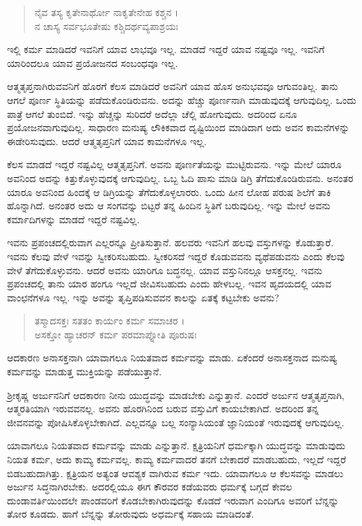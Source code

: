 \begin{verse}
ನೈವ ತಸ್ಯ ಕೃತೇನಾರ್ಥೋ ನಾಕೃತೇನೇಹ ಕಶ್ಚನ ।\\ನ ಚಾಸ್ಯ ಸರ್ವಭೂತೇಷು ಕಶ್ಚಿದರ್ಥವ್ಯಪಾಶ್ರಯಃ 
\end{verse}

{\small ಇಲ್ಲಿ ಕರ್ಮ ಮಾಡಿದರೆ ಇವನಿಗೆ ಯಾವ ಲಾಭವೂ ಇಲ್ಲ. ಮಾಡದೆ ಇದ್ದರೆ ಯಾವ ನಷ್ಟವೂ ಇಲ್ಲ. ಇವನಿಗೆ ಯಾರಿಂದಲೂ ಯಾವ ಪ್ರಯೋಜನದ ಸಂಬಂಧವೂ ಇಲ್ಲ.}

ಆತ್ಮತೃಪ್ತನಾಗಿರುವವನಿಗೆ ಹೊರಗೆ ಕೆಲಸ ಮಾಡಿದರೆ ಅವನಿಗೆ ಯಾವ ಹೊಸ ಅನುಭವವೂ ಆಗುವಂತಿಲ್ಲ. ತಾನು ಆಗಲೆ ಪೂರ್ಣ ಸ್ಥಿತಿಯನ್ನು ಪಡೆದುಕೊಂಡಿರುವನು. ಅದನ್ನು ಹೆಚ್ಚು ಪೂರ್ಣನಾಗಿ ಮಾಡುವುದಕ್ಕೆ ಆಗುವುದಿಲ್ಲ. ಒಂದು ಪಾತ್ರೆ ಆಗಲೆ ತುಂಬಿದೆ. ಇನ್ನು ಹೆಚ್ಚನ್ನು ಸುರಿದರೆ ಅದೆಲ್ಲಾ ಚೆಲ್ಲಿ ಹೋಗುವುದು. ಅದರಿಂದ ಏನೂ ಪ್ರಯೋಜನವಾಗುವುದಿಲ್ಲ. ಸಾಧಾರಣ ಮನುಷ್ಯ ಲೌಕಿಕವಾದ ದೃಷ್ಟಿಯಿಂದ ಮಾಡಿದಾಗ ಅದು ಅವನ ಕಾಮನೆಗಳನ್ನು ಈಡೇರಿಸುವುದು. ಆದರೆ ಆತ್ಮತೃಪ್ತನಿಗೆ ಯಾವ ಕಾಮನೆಗಳೂ ಇಲ್ಲ.

ಕೆಲಸ ಮಾಡದೆ ಇದ್ದರೆ ನಷ್ಟವಿಲ್ಲ ಆತ್ಮತೃಪ್ತನಿಗೆ. ಅವನು ಪೂರ್ಣತೆಯನ್ನು ಮುಟ್ಟಿರುವನು. ಇನ್ನು ಮೇಲೆ ಯಾರೂ ಅವನಿಂದ ಅದನ್ನು ಕಿತ್ತುಕೊಳ್ಳುವುದಕ್ಕೆ ಆಗುವುದಿಲ್ಲ. ಒಬ್ಬ ಓದಿ ಪಾಸು ಮಾಡಿ ಡಿಗ್ರಿ ತೆಗೆದುಕೊಂಡಿರುವನು. ಅನಂತರ ಯಾರೂ ಅವನಿಂದ ಹಿಂದಕ್ಕೆ ಆ ಡಿಗ್ರಿಯನ್ನು ತೆಗೆದುಕೊಳ್ಳಲಾರರು. ಒಂದು ಹೀನ ಲೋಹ ಪರುಷ ಶಿಲೆಗೆ ತಾಕಿ ಹೊನ್ನಾಗಿದೆ. ಅನಂತರ ಅದು ಆ ಸಂಗವನ್ನು ಬಿಟ್ಟರೆ ತನ್ನ ಹಿಂದಿನ ಸ್ಥಿತಿಗೆ ಬರುವುದಿಲ್ಲ. ಇನ್ನು ಮೇಲೆ ಅವನು ಕರ್ಮಾದಿಗಳನ್ನು ಮಾಡದೆ ಇದ್ದರೆ ನಷ್ಟವಿಲ್ಲ.

ಇವನು ಪ್ರಪಂಚದಲ್ಲಿರುವಾಗ ಎಲ್ಲರನ್ನೂ ಪ್ರೀತಿಸುತ್ತಾನೆ. ಹಲವರು ಇವನಿಗೆ ಹಲವು ವಸ್ತುಗಳನ್ನು ಕೊಡುತ್ತಾರೆ. ಇವನು ಕೆಲವು ವೇಳೆ ಇವನ್ನು ಸ್ವೀಕರಿಸಬಹುದು. ಸ್ವೀಕರಿಸದೆ ಇದ್ದರೆ ಕೊಡುವವನು ವ್ಯಥೆಪಡುವನು ಎಂದು ಕೆಲವು ವೇಳೆ ತೆಗೆದುಕೊಳ್ಳುವನು. ಆದರೆ ಅವನು ಯಾರಿಗೂ ಬದ್ಧನಲ್ಲ. ಯಾವ ವಸ್ತುನಿನಲ್ಲೂ ಆಸಕ್ತನಲ್ಲ. ಇವನು ಪ್ರಪಂಚದಲ್ಲಿ ತಾನು ಯಾರ ಹಂಗೂ ಇಲ್ಲದೆ ಜೀವಿಸಬಹುದು ಎಂದು ಹೇಳಬಲ್ಲ. ಇವನ ಹೃದಯದಲ್ಲಿ ಯಾವ ವಾಂಛನೆಗಳೂ ಇಲ್ಲ. ಇನ್ನು ಅವನ್ನು ತೃಪ್ತಿಪಡಿಸುವವನ ಕಾಲನ್ನು ಏತಕ್ಕೆ ಕಟ್ಟಬೇಕು ಅವನು?

\begin{verse}
ತಸ್ಮಾದಸಕ್ತಃ ಸತತಂ ಕಾರ್ಯಂ ಕರ್ಮ ಸಮಾಚರ ।\\ಅಸಕ್ತೋ ಹ್ಯಾಚರನ್ ಕರ್ಮ ಪರಮಾಪ್ನೋತಿ ಪೂರುಷಃ 
\end{verse}

{\small ಆದಕಾರಣ ಅನಾಸಕ್ತನಾಗಿ ಯಾವಾಗಲೂ ನಿಯತವಾದ ಕರ್ಮವನ್ನು ಮಾಡು. ಏಕೆಂದರೆ ಅನಾಸಕ್ತನಾದ ಮನುಷ್ಯ ಕರ್ಮವನ್ನು ಮಾಡುತ್ತ ಮುಕ್ತಿಯನ್ನು ಪಡೆಯುತ್ತಾನೆ.}

ಶ್ರೀಕೃಷ್ಣ ಅರ್ಜುನನಿಗೆ ಆದಕಾರಣ ನೀನು ಯುದ್ಧವನ್ನು ಮಾಡಬೇಕು ಎನ್ನುತ್ತಾನೆ. ಎಂದರೆ ಅರ್ಜುನ ಆತ್ಮತೃಪ್ತನಾಗಿ, ಆತ್ಮರತಿಯಾಗಿ ಇರುವವನಲ್ಲ. ಅವನು ಹೊರಗಿನಿಂದ ಬರುವ ವಸ್ತುವಿಗೆ ಕಾಯಬೇಕಾಗಿದೆ. ಅದರಿಂದ ತನ್ನ ಜೀವನವನ್ನು ಪೋಷಿಸಿಕೊಳ್ಳಬೇಕಾಗಿದೆ. ಎಲ್ಲವನ್ನೂ ಬಲ್ಲ ಸಂನ್ಯಾಸಿಯಂತೆ ಜ್ಞಾನಿಯಂತೆ ಇರುವುದಕ್ಕೆ ಆಗುವುದಿಲ್ಲ.

ಯಾವಾಗಲೂ ನಿಯತವಾದ ಕರ್ಮವನ್ನು ಮಾಡು ಎನ್ನುತ್ತಾನೆ. ಕ್ಷತ್ರಿಯನಿಗೆ ಧರ್ಮಕ್ಕಾಗಿ ಯುದ್ಧವನ್ನು ಮಾಡುವುದು ನಿಯತ ಕರ್ಮ, ಅದು ಕಾಮ್ಯ ಕರ್ಮವಲ್ಲ. ಕಾಮ್ಯ ಕರ್ಮವಾದರೆ ತನಗೆ ಬೇಕಾದರೆ ಮಾಡಬಹುದು, ಇಲ್ಲದೆ ಇದ್ದರೆ ಬಿಡಬಹುದಾಗಿತ್ತು. ಕ್ಷತ್ರಿಯನ ಅತ್ಯಂತ ಆವಶ್ಯಕ ವಾಗಿರುವ ಕರ್ಮ ಇದು. ಯಾವಾಗಲೂ ಆ ಕೆಲಸವನ್ನು ಮಾಡಲು ಅರ್ಜುನ ಸಿದ್ಧನಾಗಿರಬೇಕು. ಅದರಲ್ಲಿಯೂ ಈಗ ಕೌರವರ ಕಡೆಯವರು ಧರ್ಮಕ್ಕೆ ಬಗ್ಗದೆ ಕೇವಲ ದುಂಡಾವರ್ತಿಯಿಂದಲೇ ಪಾಂಡವರಿಗೆ ಕೊಡಬೇಕಾಗಿರುವುದನ್ನು ಕೊಡದೆ ಇರುವಾಗ ಎಂದಿಗೂ ಅವರಿಗೆ ಬೆನ್ನನ್ನು ತೋರ ಕೂಡದು. ಹಾಗೆ ಬೆನ್ನನ್ನು ತೋರುವುದು ಅಧರ್ಮಕ್ಕೆ ಸಹಾಯ ಮಾಡಿದಂತೆ.

